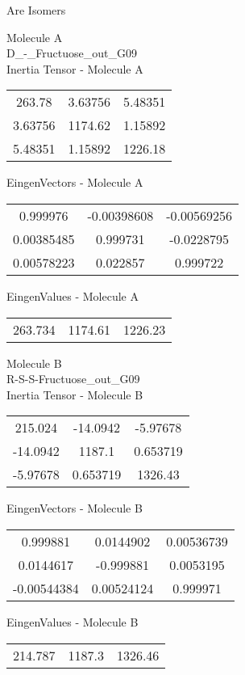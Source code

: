 \begin{center}
\vtab
\vtab
\textcolor{NavyBlue}{\Large Are Isomers}
\end{center}
\newpage
\begin{multicols}{2}
\begin{center}
Molecule A \\ 
D\_-\_Fructuose\_out\_G09
\\
Inertia Tensor - Molecule A \\
\vtab
\begin{tabular}{|c c c|}
263.78	 & 	3.63756	 & 	5.48351	 \\
3.63756	 & 	1174.62	 & 	1.15892	 \\
5.48351	 & 	1.15892	 & 	1226.18
\end{tabular}

\vtab
 EingenVectors - Molecule A     \\
\vtab
\begin{tabular}{|c c c|}
0.999976	 & 	-0.00398608	 & 	-0.00569256	 \\
0.00385485	 & 	0.999731	 & 	-0.0228795	 \\
0.00578223	 & 	0.022857	 & 	0.999722
\end{tabular}

\vtab
 EingenValues - Molecule A     \\
\vtab
\begin{tabular}{|c c c|}
263.734	 & 	1174.61	 & 	1226.23
\end{tabular}
\columnbreak

Molecule B \\ 
R-S-S-Fructuose\_out\_G09
\\
Inertia Tensor - Molecule B \\
\vtab
\begin{tabular}{|c c c|}
215.024	 & 	-14.0942	 & 	-5.97678	 \\
-14.0942	 & 	1187.1	 & 	0.653719	 \\
-5.97678	 & 	0.653719	 & 	1326.43
\end{tabular}

\vtab
 EingenVectors - Molecule B     \\
\vtab
\begin{tabular}{|c c c|}
0.999881	 & 	0.0144902	 & 	0.00536739	 \\
0.0144617	 & 	-0.999881	 & 	0.0053195	 \\
-0.00544384	 & 	0.00524124	 & 	0.999971
\end{tabular}

\vtab
 EingenValues - Molecule B     \\
\vtab
\begin{tabular}{|c c c|}
214.787	 & 	1187.3	 & 	1326.46
\end{tabular}

\end{center}
\end{multicols}
